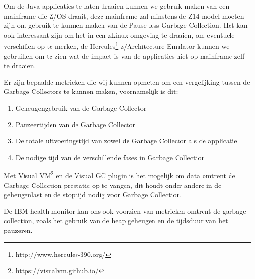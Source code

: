 Om de Java applicaties te laten draaien kunnen we gebruik maken van een mainframe die Z/OS draait, deze mainframe zal minstens de Z14 model moeten zijn om gebruik te kunnen maken van de Pause-less Garbage Collection.
Het kan ook interessant zijn om het in een zLinux omgeving te draaien, om eventuele verschillen op te merken, de Hercules\footnote{http://www.hercules-390.org/} z/Architecture Emulator kunnen we gebruiken om te zien wat de impact is van de applicaties niet op mainframe zelf te draaien.

Er zijn bepaalde metrieken die wij kunnen opmeten om een vergelijking tussen de Garbage Collectors te kunnen maken, voornamelijk is dit:
\begin{enumerate}
    \item Geheugengebruik van de Garbage Collector
    \item Pauzeertijden van de Garbage Collector
    \item De totale uitvoeringstijd van zowel de Garbage Collector als de applicatie
    \item De nodige tijd van de verschillende fases in Garbage Collection
\end{enumerate}

Met Visual VM\footnote{https://visualvm.github.io/} en de Visual GC plugin is het mogelijk om data omtrent de Garbage Collection prestatie op te vangen, dit houdt onder andere in de geheugenlast en de stoptijd nodig voor Garbage Collection.


De IBM health monitor kan ons ook voorzien van metrieken omtrent de garbage collection, zoals het gebruik van de heap geheugen en de tijdsduur van het pauzeren. 




